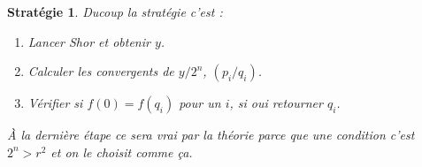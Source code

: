 \documentclass[a4paper,12pt]{book}
\theoremstyle{plain}
\newtheorem{strat}{Stratégie}
\theoremstyle{definition}
\theoremstyle{remark}
\begin{document}
\begin{strat}
    Ducoup la stratégie c'est : 
    \begin{enumerate}
        \item Lancer Shor et obtenir $y$.
        \item Calculer les convergents de $y/2^n$, $(p_i/q_i)$.
        \item Vérifier si $f(0)=f(q_i)$ pour un $i$, si oui
            retourner $q_i$.
    \end{enumerate}
    À la dernière étape ce sera vrai par la théorie parce que une
    condition c'est $2^n>r^2$ et on le choisit comme ça.
\end{strat}
\end{document}
